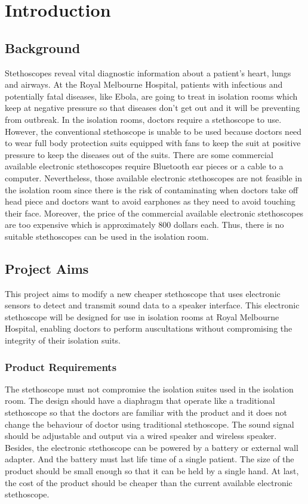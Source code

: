 \chapter{Introduction}

\section{Background}
Stethoscopes reveal vital diagnostic information about a patient’s heart, lungs and airways.  At the Royal Melbourne Hospital, patients with infectious and potentially fatal diseases, like Ebola, are going to treat in isolation rooms which keep at negative pressure so that diseases don’t get out and it will be preventing from outbreak. 
In the isolation rooms, doctors require a stethoscope to use. However, the conventional stethoscope is unable to be used because doctors need to wear full body protection suits equipped with fans to keep the suit at positive pressure to keep the diseases out of the suits.  There are some commercial available electronic stethoscopes require Bluetooth ear pieces or a cable to a computer.  Nevertheless, those available electronic stethoscopes are not feasible in the isolation room since there is the risk of contaminating when doctors take off head piece and doctors want to avoid earphones as they need to avoid touching their face. Moreover, the price of the commercial available electronic stethoscopes are too expensive which is approximately 800 dollars each.  Thus, there is no suitable stethoscopes can be used in the isolation room.

\section{Project Aims}
This project aims to modify a new cheaper stethoscope that uses electronic sensors to detect and transmit sound data to a speaker interface. This electronic stethoscope will be designed for use in isolation rooms at Royal Melbourne Hospital, enabling doctors to perform auscultations without compromising the integrity of their isolation suits. 

\subsection{Product Requirements}
The stethoscope must not compromise the isolation suites used in the isolation room. The design should have a diaphragm that operate like a traditional stethoscope so that the doctors are familiar with the product and it does not change the behaviour of doctor using traditional stethoscope. The sound signal should be adjustable and output via a wired speaker and wireless speaker.  Besides, the electronic stethoscope can be powered by a battery or external wall adapter. And the battery must last life time of a single patient. The size of the product should be small enough so that it can be held by a single hand. At last, the cost of the product should be cheaper than the current available electronic stethoscope.

